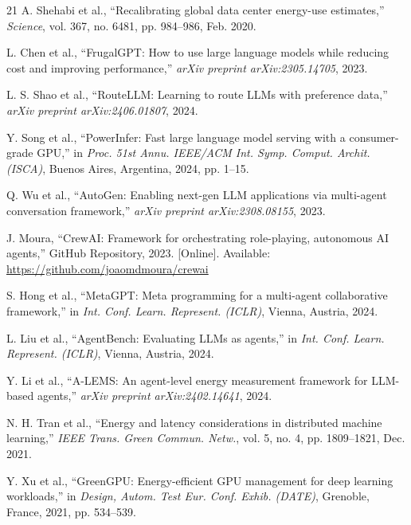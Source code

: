 \documentclass[journal]{IEEEtran}
\begin{document}
\begin{thebibliography}{21}
A. Shehabi et al., ``Recalibrating global data center energy-use estimates,''
\textit{Science}, vol. 367, no. 6481, pp. 984--986, Feb. 2020.

L. Chen et al., ``FrugalGPT: How to use large language models while reducing
cost and improving performance,'' \textit{arXiv preprint arXiv:2305.14705},
2023.

L. S. Shao et al., ``RouteLLM: Learning to route LLMs with preference data,''
\textit{arXiv preprint arXiv:2406.01807}, 2024.

Y. Song et al., ``PowerInfer: Fast large language model serving with a
consumer-grade GPU,'' in \textit{Proc. 51st Annu. IEEE/ACM Int. Symp.
Comput. Archit. (ISCA)}, Buenos Aires, Argentina, 2024, pp. 1--15.

Q. Wu et al., ``AutoGen: Enabling next-gen LLM applications via multi-agent
conversation framework,'' \textit{arXiv preprint arXiv:2308.08155}, 2023.

J. Moura, ``CrewAI: Framework for orchestrating role-playing, autonomous AI
agents,'' GitHub Repository, 2023. [Online]. Available:
\url{https://github.com/joaomdmoura/crewai}

S. Hong et al., ``MetaGPT: Meta programming for a multi-agent collaborative
framework,'' in \textit{Int. Conf. Learn. Represent. (ICLR)}, Vienna,
Austria, 2024.

L. Liu et al., ``AgentBench: Evaluating LLMs as agents,'' in \textit{Int.
Conf. Learn. Represent. (ICLR)}, Vienna, Austria, 2024.

Y. Li et al., ``A-LEMS: An agent-level energy measurement framework for
LLM-based agents,'' \textit{arXiv preprint arXiv:2402.14641}, 2024.

N. H. Tran et al., ``Energy and latency considerations in distributed machine
learning,'' \textit{IEEE Trans. Green Commun. Netw.}, vol. 5, no. 4,
pp. 1809--1821, Dec. 2021.

Y. Xu et al., ``GreenGPU: Energy-efficient GPU management for deep learning
workloads,'' in \textit{Design, Autom. Test Eur. Conf. Exhib. (DATE)},
Grenoble, France, 2021, pp. 534--539.

\end{thebibliography}
\end{document}
